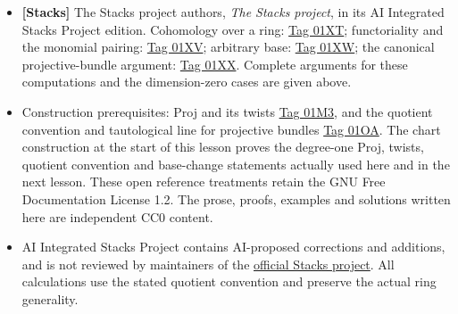 \documentclass[11pt]{article}
\providecommand{\tightlist}{\setlength{\itemsep}{0pt}\setlength{\parskip}{0pt}}
\begin{document}
\begin{itemize}
\tightlist
\item
  \textbf{{[}Stacks{]}} The Stacks project authors, \emph{The Stacks
  project}, in its AI Integrated Stacks Project edition. Cohomology over
  a ring:
  \href{https://kokunoyumeto.github.io/stacks-zh-hans-cn/en/coherent.html\#coherent-lemma-cohomology-projective-space-over-ring}{Tag
  01XT}; functoriality and the monomial pairing:
  \href{https://kokunoyumeto.github.io/stacks-zh-hans-cn/en/coherent.html\#coherent-lemma-identify-functorially}{Tag
  01XV}; arbitrary base:
  \href{https://kokunoyumeto.github.io/stacks-zh-hans-cn/en/coherent.html\#coherent-lemma-cohomology-projective-space-over-base}{Tag
  01XW}; the canonical projective-bundle argument:
  \href{https://kokunoyumeto.github.io/stacks-zh-hans-cn/en/coherent.html\#coherent-lemma-cohomology-projective-bundle}{Tag
  01XX}. Complete arguments for these computations and the
  dimension-zero cases are given above.
\item
  Construction prerequisites: Proj and its twists
  \href{https://kokunoyumeto.github.io/stacks-zh-hans-cn/en/constructions.html\#constructions-section-proj}{Tag
  01M3}, and the quotient convention and tautological line for
  projective bundles
  \href{https://kokunoyumeto.github.io/stacks-zh-hans-cn/en/constructions.html\#constructions-section-projective-bundle}{Tag
  01OA}. The chart construction at the start of this lesson proves the
  degree-one Proj, twists, quotient convention and base-change
  statements actually used here and in the next lesson. These open
  reference treatments retain the GNU Free Documentation License 1.2.
  The prose, proofs, examples and solutions written here are independent
  CC0 content.
\item
  AI Integrated Stacks Project contains AI-proposed corrections and
  additions, and is not reviewed by maintainers of the
  \href{https://stacks.math.columbia.edu/}{official Stacks project}. All
  calculations use the stated quotient convention and preserve the
  actual ring generality.
\end{itemize}
\end{document}
